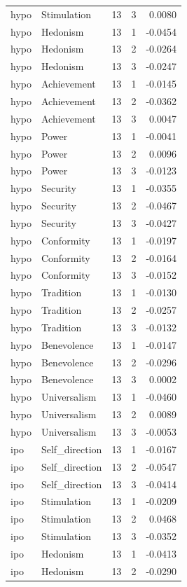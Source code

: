 \begin{tabular}{llrrr}
hypo & Stimulation & 13 & 3 & 0.0080 \\
hypo & Hedonism & 13 & 1 & -0.0454 \\
hypo & Hedonism & 13 & 2 & -0.0264 \\
hypo & Hedonism & 13 & 3 & -0.0247 \\
hypo & Achievement & 13 & 1 & -0.0145 \\
hypo & Achievement & 13 & 2 & -0.0362 \\
hypo & Achievement & 13 & 3 & 0.0047 \\
hypo & Power & 13 & 1 & -0.0041 \\
hypo & Power & 13 & 2 & 0.0096 \\
hypo & Power & 13 & 3 & -0.0123 \\
hypo & Security & 13 & 1 & -0.0355 \\
hypo & Security & 13 & 2 & -0.0467 \\
hypo & Security & 13 & 3 & -0.0427 \\
hypo & Conformity & 13 & 1 & -0.0197 \\
hypo & Conformity & 13 & 2 & -0.0164 \\
hypo & Conformity & 13 & 3 & -0.0152 \\
hypo & Tradition & 13 & 1 & -0.0130 \\
hypo & Tradition & 13 & 2 & -0.0257 \\
hypo & Tradition & 13 & 3 & -0.0132 \\
hypo & Benevolence & 13 & 1 & -0.0147 \\
hypo & Benevolence & 13 & 2 & -0.0296 \\
hypo & Benevolence & 13 & 3 & 0.0002 \\
hypo & Universalism & 13 & 1 & -0.0460 \\
hypo & Universalism & 13 & 2 & 0.0089 \\
hypo & Universalism & 13 & 3 & -0.0053 \\
ipo & Self\_direction & 13 & 1 & -0.0167 \\
ipo & Self\_direction & 13 & 2 & -0.0547 \\
ipo & Self\_direction & 13 & 3 & -0.0414 \\
ipo & Stimulation & 13 & 1 & -0.0209 \\
ipo & Stimulation & 13 & 2 & 0.0468 \\
ipo & Stimulation & 13 & 3 & -0.0352 \\
ipo & Hedonism & 13 & 1 & -0.0413 \\
ipo & Hedonism & 13 & 2 & -0.0290 \\

\end{tabular}
